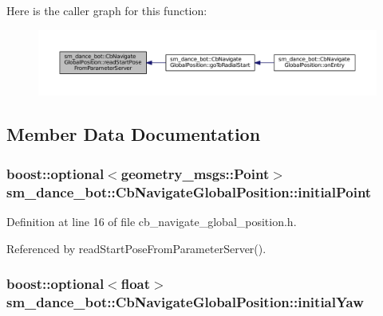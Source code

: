 Here is the caller graph for this function\+:
\nopagebreak
\begin{figure}[H]
\begin{center}
\leavevmode
\includegraphics[width=350pt]{classsm__dance__bot_1_1CbNavigateGlobalPosition_a81b78925b3ab8a426f471cb74d0b9756_icgraph}
\end{center}
\end{figure}




\subsection{Member Data Documentation}
\subsubsection[{\texorpdfstring{initial\+Point}{initialPoint}}]{\setlength{\rightskip}{0pt plus 5cm}boost\+::optional$<$geometry\+\_\+msgs\+::\+Point$>$ sm\+\_\+dance\+\_\+bot\+::\+Cb\+Navigate\+Global\+Position\+::initial\+Point}\hypertarget{classsm__dance__bot_1_1CbNavigateGlobalPosition_a9b81342ca5492d3b9724c488c1f39f4f}{}\label{classsm__dance__bot_1_1CbNavigateGlobalPosition_a9b81342ca5492d3b9724c488c1f39f4f}


Definition at line 16 of file cb\+\_\+navigate\+\_\+global\+\_\+position.\+h.



Referenced by read\+Start\+Pose\+From\+Parameter\+Server().

\subsubsection[{\texorpdfstring{initial\+Yaw}{initialYaw}}]{\setlength{\rightskip}{0pt plus 5cm}boost\+::optional$<$float$>$ sm\+\_\+dance\+\_\+bot\+::\+Cb\+Navigate\+Global\+Position\+::initial\+Yaw}\hypertarget{classsm__dance__bot_1_1CbNavigateGlobalPosition_ad7ac13ee1b0f1a5dfdd47639930ab34c}{}\label{classsm__dance__bot_1_1CbNavigateGlobalPosition_ad7ac13ee1b0f1a5dfdd47639930ab34c}


